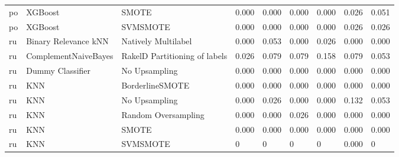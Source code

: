 \begin{tabular}{lllllllll}
      po &                         XGBoost &                         SMOTE &     0.000 &                     0.000 &                 0.000 &                  0.000 &                                   0.026 &     0.051 \\
      po &                         XGBoost &                      SVMSMOTE &     0.000 &                     0.000 &                 0.000 &                  0.000 &                                   0.026 &     0.026 \\
      ru &            Binary Relevance kNN &           Natively Multilabel &     0.000 &                     0.053 &                 0.000 &                  0.026 &                                   0.000 &     0.000 \\
      ru &            ComplementNaiveBayes & RakelD Partitioning of labels &     0.026 &                     0.079 &                 0.079 &                  0.158 &                                   0.079 &     0.053 \\
      ru &                Dummy Classifier &                 No Upsampling &     0.000 &                     0.000 &                 0.000 &                  0.000 &                                   0.000 &     0.000 \\
      ru &                             KNN &               BorderlineSMOTE &     0.000 &                     0.000 &                 0.000 &                  0.000 &                                   0.000 &     0.000 \\
      ru &                             KNN &                 No Upsampling &     0.000 &                     0.026 &                 0.000 &                  0.000 &                                   0.132 &     0.053 \\
      ru &                             KNN &           Random Oversampling &     0.000 &                     0.000 &                 0.026 &                  0.000 &                                   0.000 &     0.000 \\
      ru &                             KNN &                         SMOTE &     0.000 &                     0.000 &                 0.000 &                  0.000 &                                   0.000 &     0.000 \\
      ru &                             KNN &                      SVMSMOTE &         0 &                         0 &                     0 &                      0 &                                   0.000 &         0 \\

\end{tabular}
